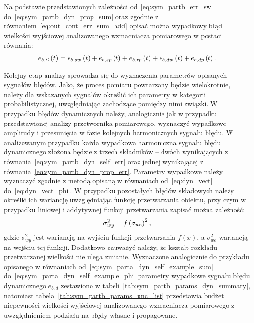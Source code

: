 Na podstawie przedstawionych zależności od~\eqref{eq:sym_partb_err_sw} do~\eqref{eq:sym_partb_dyn_prop_sum} oraz zgodnie z równaniem~\eqref{eq:out_cont_err_sum_add} opisać można wypadkowy błąd wielkości wyjściowej analizowanego wzmacniacza pomiarowego w postaci równania:
\begin{equation}
e_{b,\Sigma} \left(t\right) = e_{b,sw} \left(t\right) + e_{b,sp} \left(t\right) + e_{b,rp} \left(t\right) + e_{b,dw} \left(t\right) + e_{b,dp} \left(t\right) \label{eq:sym_partb_error_sum}.
\end{equation}

Kolejny etap analizy sprowadza się do wyznaczenia parametrów opisanych sygnałów błędów. Jako, że proces pomiaru powtarzany będzie wielokrotnie, należy dla wskazanych sygnałów określić ich parametry w kategorii probabilistycznej, uwzględniając zachodzące pomiędzy nimi związki. W przypadku błędów dynamicznych należy, analogicznie jak w przypadku przedstawionej analizy przetwornika pomiarowego, wyznaczyć wypadkowe amplitudy i przesunięcia w fazie kolejnych harmonicznych sygnału błędu. W analizowanym przypadku każda wypadkowa harmoniczna sygnału błędu dynamicznego złożona będzie z trzech składników -- dwóch wynikających z równania~\eqref{eq:sym_partb_dyn_self_err} oraz jednej wynikającej z równania~\eqref{eq:sym_partb_dyn_prop_err}. Parametry wypadkowe należy wyznaczyć zgodnie z metodą opisaną w równaniach od~\eqref{eq:dyn_vect} do~\eqref{eq:dyn_vect_phi}. W przypadku pozostałych błędów składowych należy określić ich wariancję uwzględniając funkcję przetwarzania obiektu, przy czym w przypadku liniowej i addytywnej funkcji przetwarzania zapisać można zależność:
\begin{equation}
\sigma_{wy}^{2} = f \left(\sigma_{we}\right)^{2} \label{eq:var_function},
\end{equation}
gdzie $\sigma_{wy}^{2}$ jest wariancją na wyjściu funkcji przetwarzania $f(x)$, a $\sigma_{we}^{2}$ wariancją na wejściu tej funkcji. Dodatkowo zauważyć należy, że kształt rozkładu przetwarzanej wielkości nie ulega zmianie. Wyznaczone analogicznie do przykładu opisanego w równaniach od~\eqref{eq:sym_parta_dyn_self_example_sum} do~\eqref{eq:sym_parta_dyn_self_example_phi} parametry wypadkowe sygnału błędu dynamicznego $e_{b,d}$ zestawiono w tabeli~\ref{tab:sym_partb_params_dyn_summary}, natomiast tabela~\ref{tab:sym_partb_params_unc_list} przedstawia budżet niepewności wielkości wyjściowej analizowanego wzmacniacza pomiarowego z uwzględnieniem podziału na błędy własne i propagowane.

